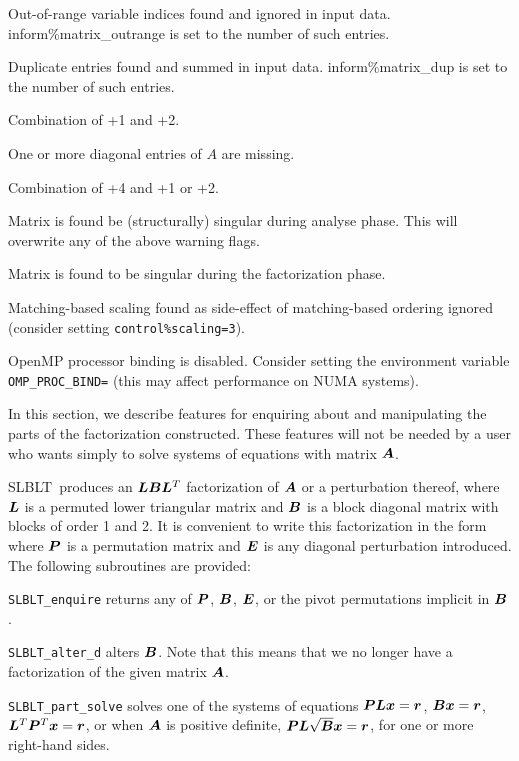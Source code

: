 \documentclass{galahad}
\newcommand{\packagename}{SLBLT}
\begin{document}
\begin{description} 
Out-of-range variable indices found and ignored in input
data. inform\%matrix\_outrange is set to the number of such
entries.

Duplicate entries found and summed in input data.
inform\%matrix\_dup is set to the number of such entries.

Combination of +1 and +2.

One or more diagonal entries of $A$ are missing.

Combination of +4 and +1 or +2.

Matrix is found be (structurally) singular during analyse
phase. This will overwrite any of the above warning flags.

Matrix is found to be singular during the factorization phase.

Matching-based scaling found as side-effect of
matching-based ordering ignored
(consider setting {\tt control\%scaling=3}).

OpenMP processor binding is disabled. Consider setting
the environment variable {\tt OMP\_PROC\_BIND=\true} (this may
affect performance on NUMA systems).

\end{description}


\galfeatures
\noindent In this section, we describe features for enquiring about and
manipulating the parts of the factorization constructed. These features
will not be needed by a user who wants simply to solve systems of
equations with matrix ${\bm{A}}$.

\packagename\ produces an ${\bm{L}} {\bm{B}} {\bm{L}}^T$ factorization
of ${\bm{A}}$ or a perturbation thereof, where ${\bm{L}}$ is a permuted lower
triangular matrix and ${\bm{B}}$ is a block diagonal matrix with blocks of order
1 and 2. It is convenient to write this factorization in the form
where ${\bm{P}}$ is a permutation matrix and ${\bm{E}}$ is any diagonal perturbation
introduced. The following subroutines are provided:
\begin{description}
\ittf{} {\tt \packagename\_enquire} returns any of ${\bm{P}}$, ${\bm{B}}$, ${\bm{E}}$,
or the pivot permutations implicit in ${\bm{B}}$.

\ittf{} {\tt \packagename\_alter\_d} alters ${\bm{B}}$. Note that this means that
we no longer have a factorization of the given matrix ${\bm{A}}$.

\ittf{} {\tt \packagename\_part\_solve} solves one of the systems of equations
${\bm{P}} {\bm{L}} {\bm{x}} =  {\bm{r}}$,
${\bm{B}} {\bm{x}} =  {\bm{r}}$,
${\bm{L}}^T {\bm{P}}^T {\bm{x}} =  {\bm{r}}$, or when ${\bm{A}}$ is positive definite,
${\bm{P}} {\bm{L}} \sqrt{{\bm{B}}}{\bm{x}} =  {\bm{r}}$,
for one or more right-hand sides.

\end{description}
\end{document}
